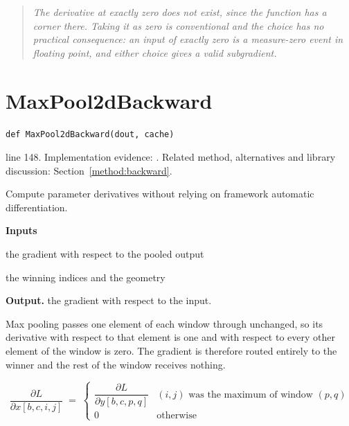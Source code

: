\begin{quote}\small\itshape The derivative at exactly zero does not exist, since the function has a corner there. Taking it as zero is conventional and the choice has no practical consequence: an input of exactly zero is a measure-zero event in floating point, and either choice gives a valid subgradient.\end{quote}


\section{MaxPool2dBackward}\label{fn:train:MaxPool2dBackward}
\begin{lstlisting}[style=sig]
def MaxPool2dBackward(dout, cache)
\end{lstlisting}
 line 148. Implementation evidence: \cite{code2026}. Related method, alternatives and library discussion: Section~\ref{method:backward}.


Compute parameter derivatives without relying on framework automatic differentiation.




\noindent\textbf{Inputs}
\begin{description}[leftmargin=2.2em,style=nextline,font=\normalfont\ttfamily]\setlength\itemsep{1pt}
  \item[{dout}] \normalfont the gradient with respect to the pooled output
  \item[{cache}] \normalfont the winning indices and the geometry
\end{description}

\noindent\textbf{Output.} the gradient with respect to the input.


Max pooling passes one element of each window through unchanged, so its derivative with respect to that element is one and with respect to every other element of the window is zero. The gradient is therefore routed entirely to the winner and the rest of the window receives nothing.


\begin{equation}
\frac{\partial L}{\partial x[b,c,i,j]} \;=\; \begin{cases} \dfrac{\partial L}{\partial y[b,c,p,q]} & (i,j) \text{ was the maximum of window } (p,q) \\[6pt] 0 & \text{otherwise} \end{cases}
\end{equation}

